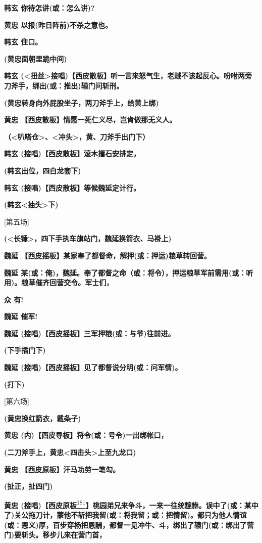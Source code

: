 \textbf{韩玄 你待怎讲(或：怎么讲)?}

\textbf{黄忠 以报(昨日阵前)不杀之意也。}

\textbf{韩玄 住口。}

\textbf{(黄忠面朝里跪中间)}

\textbf{韩玄
(\textless{}扭丝\textgreater{}接唱)【西皮散板】听一言来怒气生，老贼不该起反心。吩咐两旁刀斧手，绑出(或：推出)辕门问斩刑。}

\textbf{(黄忠转身向外屁股坐子，两刀斧手上，给黄上绑)}

\textbf{黄忠 【西皮散板】情愿一死仁义尽，岂肯做那无义人。}

\textbf{（\textless{}叭嗒仓\textgreater{}、\textless{}冲头\textgreater{}，黄、刀斧手出门下）}

\textbf{韩玄 (接唱)【西皮散板】滚木擂石安排定，}

\textbf{(韩玄出位，四白龙套下)}

\textbf{韩玄 (接唱)【西皮散板】等候魏延定计行。}

\textbf{(韩玄\textless{}抽头\textgreater{}下)}

{[}第五场{]}

\textbf{(\textless{}长锤\textgreater{}，四下手执车旗站门，魏延换箭衣、马褂上)}

\textbf{魏延 【西皮摇板】某家奉了都督命，解押(或：押运)粮草转回营。}

\textbf{魏延
某(或：俺)，魏延。奉了都督{之命}（或：将令），押运粮草军前{需用}(或：听用)。粮草催齐回营交令。军士们，}

\textbf{众 有!}

\textbf{魏延 催军!}

\textbf{魏延 (接唱)【西皮摇板】三军押粮(或：与爷)往前进。}

\textbf{(下手插门下)}

\textbf{魏延 (接唱)【西皮摇板】见了都督说分明(或：问军情)。}

\textbf{(打下)}

{[}第六场{]}

\textbf{(黄忠换红箭衣，戴条子)}

\textbf{黄忠 (内)【西皮导板】将令(或：号令)一出绑帐口，}

\textbf{(二刀斧手上，黄忠\textless{}四击头\textgreater{}上至九龙口)}

\textbf{黄忠 【西皮原板】汗马功劳一笔勾。}

\textbf{(扯正，扯四门)}

\textbf{黄忠
(接唱)【西皮原板}\protect\hyperlink{fn181}{\textsuperscript{181}}\textbf{】桃园弟兄来争斗，一来一往统貔貅。误中了(或：某中了)关公拖刀计，蒙他不斩把我留(或：将我留；或：把情留)。都只为他人情谊(或：恩义)厚，百步穿杨把恩酬，都督一见冲牛、斗，绑出了辕门(或：绑出了营门)要斩头。移步儿来在营门首，}

